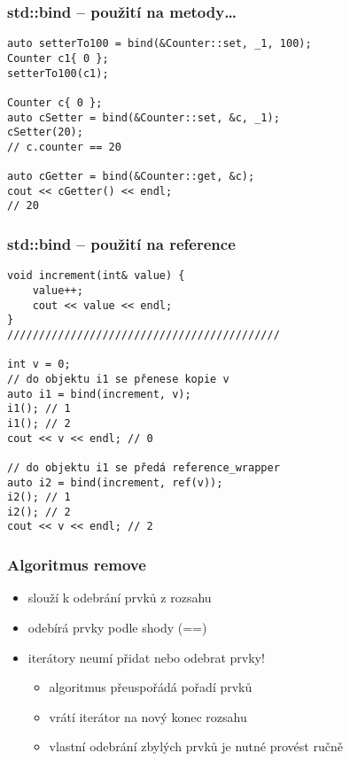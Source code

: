 \begin{frame}[fragile]
\frametitle{std::bind -- použití na metody\ldots}

\begin{yesblock}
\begin{lstlisting}[basicstyle=\small]
auto setterTo100 = bind(&Counter::set, _1, 100);
Counter c1{ 0 };
setterTo100(c1);

Counter c{ 0 };
auto cSetter = bind(&Counter::set, &c, _1);
cSetter(20);
// c.counter == 20

auto cGetter = bind(&Counter::get, &c);
cout << cGetter() << endl;
// 20
\end{lstlisting}
\end{yesblock}
\end{frame}



\begin{frame}[fragile]
\frametitle{std::bind -- použití na reference}

\begin{yesblock}
\begin{lstlisting}[basicstyle=\small]
void increment(int& value) {
	value++;
	cout << value << endl;
}
///////////////////////////////////////////

int v = 0;
// do objektu i1 se přenese kopie v
auto i1 = bind(increment, v);
i1(); // 1
i1(); // 2
cout << v << endl; // 0

// do objektu i1 se předá reference_wrapper
auto i2 = bind(increment, ref(v));
i2(); // 1
i2(); // 2
cout << v << endl; // 2
\end{lstlisting}
\end{yesblock}
\end{frame}
















\begin{frame}[fragile]
\frametitle{Algoritmus remove}
\begin{block}{}
\begin{itemize}
\item slouží k odebrání prvků z rozsahu
\item odebírá prvky podle shody (==)
\item iterátory neumí přidat nebo odebrat prvky!
\begin{itemize}
\item algoritmus přeuspořádá pořadí prvků
\item vrátí iterátor na nový konec rozsahu
\item vlastní odebrání zbylých prvků je nutné provést ručně
\end{itemize}
\end{itemize}
\end{block}
\end{frame}





